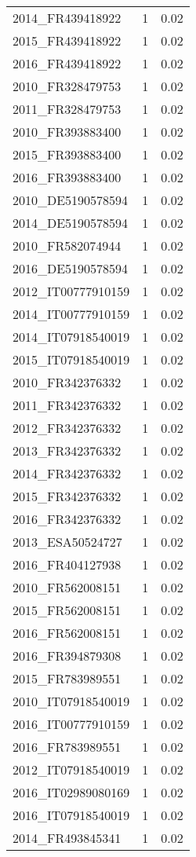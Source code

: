 \begin{table*}[htbp]
\begin{tabular}{lrr}
2014_FR439418922 & 1 & 0.02 \\
2015_FR439418922 & 1 & 0.02 \\
2016_FR439418922 & 1 & 0.02 \\
2010_FR328479753 & 1 & 0.02 \\
2011_FR328479753 & 1 & 0.02 \\
2010_FR393883400 & 1 & 0.02 \\
2015_FR393883400 & 1 & 0.02 \\
2016_FR393883400 & 1 & 0.02 \\
2010_DE5190578594 & 1 & 0.02 \\
2014_DE5190578594 & 1 & 0.02 \\
2010_FR582074944 & 1 & 0.02 \\
2016_DE5190578594 & 1 & 0.02 \\
2012_IT00777910159 & 1 & 0.02 \\
2014_IT00777910159 & 1 & 0.02 \\
2014_IT07918540019 & 1 & 0.02 \\
2015_IT07918540019 & 1 & 0.02 \\
2010_FR342376332 & 1 & 0.02 \\
2011_FR342376332 & 1 & 0.02 \\
2012_FR342376332 & 1 & 0.02 \\
2013_FR342376332 & 1 & 0.02 \\
2014_FR342376332 & 1 & 0.02 \\
2015_FR342376332 & 1 & 0.02 \\
2016_FR342376332 & 1 & 0.02 \\
2013_ESA50524727 & 1 & 0.02 \\
2016_FR404127938 & 1 & 0.02 \\
2010_FR562008151 & 1 & 0.02 \\
2015_FR562008151 & 1 & 0.02 \\
2016_FR562008151 & 1 & 0.02 \\
2016_FR394879308 & 1 & 0.02 \\
2015_FR783989551 & 1 & 0.02 \\
2010_IT07918540019 & 1 & 0.02 \\
2016_IT00777910159 & 1 & 0.02 \\
2016_FR783989551 & 1 & 0.02 \\
2012_IT07918540019 & 1 & 0.02 \\
2016_IT02989080169 & 1 & 0.02 \\
2016_IT07918540019 & 1 & 0.02 \\
2014_FR493845341 & 1 & 0.02 \\

\end{tabular}
\end{table*}
